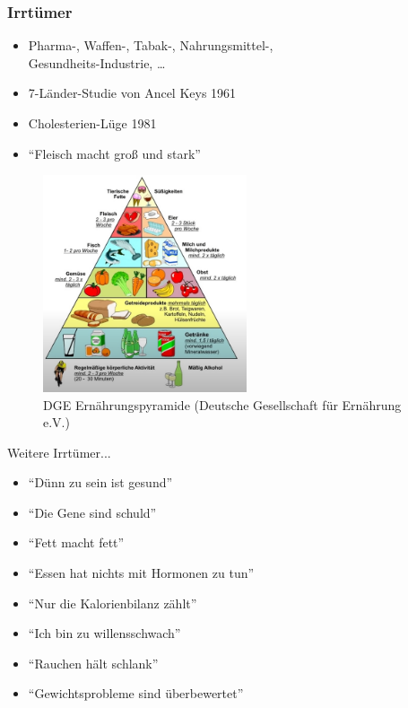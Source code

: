 \documentclass[xcolor=dvipsnames]{beamer}
\begin{document}
    \begin{frame}[allowframebreaks]
        \frametitle{Irrtümer}
        \begin{itemize}
            \setlength\itemsep{1em}
            \item Pharma-, Waffen-, Tabak-, Nahrungsmittel-,\\Gesundheits-Industrie, \ldots
            \item 7-Länder-Studie von Ancel Keys 1961
            \item Cholesterien-Lüge 1981
            \item "`Fleisch macht groß und stark"'
        \end{itemize}

        \framebreak

        \begin{figure}
            \centering
            \includegraphics[width=6cm]{../images/pyramide.png}
            \caption{DGE Ernährungspyramide (Deutsche Gesellschaft für Ernährung e.V.)}
        \end{figure}

        \framebreak

        \begin{block}{Weitere Irrtümer...}
            \begin{itemize}
                \setlength\itemsep{1em}
                \item "`Dünn zu sein ist gesund"'
                \item "`Die Gene sind schuld"'
                \item "`Fett macht fett"'
                \item "`Essen hat nichts mit Hormonen zu tun"'
                \item "`Nur die Kalorienbilanz zählt"'
                \item "`Ich bin zu willensschwach"'
                \item "`Rauchen hält schlank"'
                \item "`Gewichtsprobleme sind überbewertet"'
            \end{itemize}
        \end{block}
    \end{frame}
\end{document}
